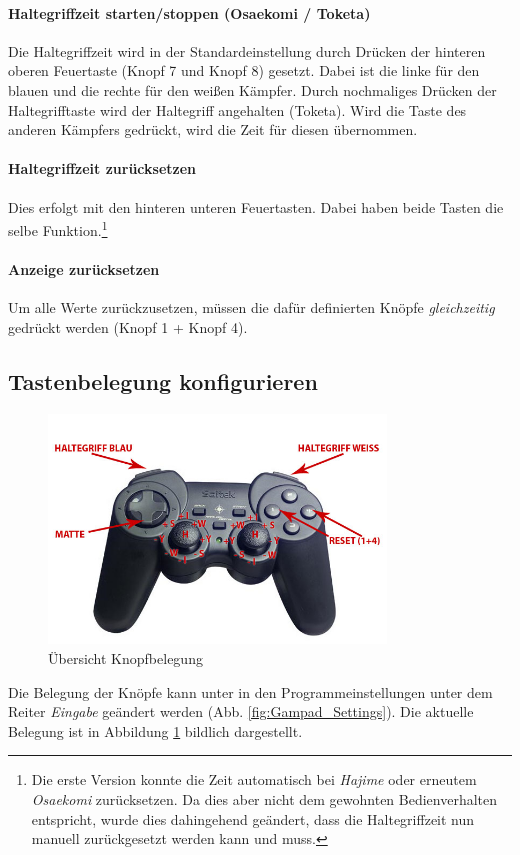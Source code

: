 ﻿\documentclass[11pt,numbers=noenddot]{scrreprt}
\begin{document}
\paragraph{Haltegriffzeit starten/stoppen (Osaekomi / Toketa)}
Die Haltegriffzeit wird in der Standardeinstellung durch Drücken der hinteren oberen Feuertaste (Knopf 7 und Knopf 8) gesetzt. Dabei ist die linke für den blauen und die rechte für den weißen Kämpfer. Durch nochmaliges Drücken der Haltegrifftaste wird der Haltegriff angehalten (Toketa). Wird die Taste des anderen Kämpfers gedrückt, wird die Zeit für diesen übernommen.

\paragraph{Haltegriffzeit zurücksetzen}
Dies erfolgt mit den hinteren unteren Feuertasten. Dabei haben beide Tasten die selbe Funktion.\footnote{Die erste Version konnte die Zeit automatisch bei \emph{Hajime} oder erneutem \emph{Osaekomi} zurücksetzen. Da dies aber nicht dem gewohnten Bedienverhalten entspricht, wurde dies dahingehend geändert, dass die Haltegriffzeit nun manuell zurückgesetzt werden kann und muss.}

\paragraph{Anzeige zurücksetzen}
Um alle Werte zurückzusetzen, müssen die dafür definierten Knöpfe \emph{gleichzeitig} gedrückt werden (Knopf 1 + Knopf 4).

\subsection{Tastenbelegung konfigurieren}
\begin{figure}
	\centering
		\includegraphics[width=0.8\textwidth]{images/p380.jpg}
	\caption{Übersicht Knopfbelegung}
	\label{fig:Belegung}
\end{figure}
Die Belegung der Knöpfe kann unter in den Programmeinstellungen unter dem Reiter \emph{Eingabe} geändert werden (Abb. \ref{fig:Gampad_Settings}). 
Die aktuelle Belegung ist in Abbildung \ref{fig:Belegung} bildlich dargestellt.
\end{document}

